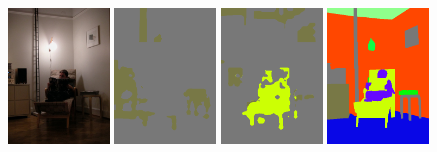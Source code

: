 \begin{figure}[tbh!]
  {\includegraphics[width=0.24\textwidth]{figures/experiments/context/image/0020.jpg}}
  {\includegraphics[width=0.24\textwidth]{figures/experiments/context/orgckpt/0020.png}}
  {\includegraphics[width=0.24\textwidth]{figures/experiments/context/nonnoisy/0020.png}}
  {\includegraphics[width=0.24\textwidth]{figures/experiments/context/gt/2008_000067.png}}
  

\end{figure}
